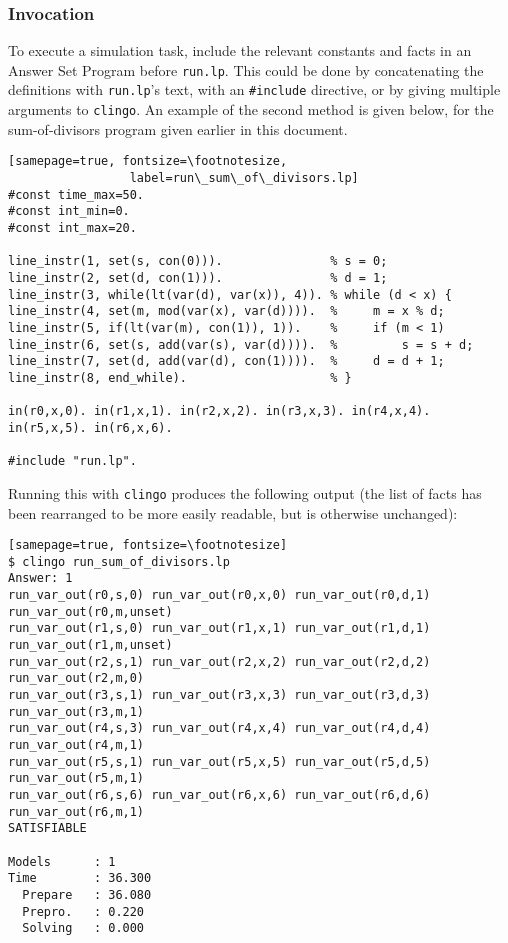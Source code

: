 \documentclass[a4paper,twoside,notitlepage,12pt]{article}
\begin{document}
\subsubsection{Invocation}

To execute a simulation task, include the relevant constants and facts in an Answer Set 
Program before \verb|run.lp|. This could be done by concatenating the definitions with 
\verb|run.lp|'s text, with an \verb|#include| directive, or by giving multiple 
arguments to \verb|clingo|. An example of the second method is given below, for the 
sum-of-divisors program given earlier in this document.

\clearpage
\begin{verbatim}[samepage=true, fontsize=\footnotesize,
                 label=run\_sum\_of\_divisors.lp]
#const time_max=50.
#const int_min=0.
#const int_max=20.

line_instr(1, set(s, con(0))).               % s = 0;
line_instr(2, set(d, con(1))).               % d = 1;
line_instr(3, while(lt(var(d), var(x)), 4)). % while (d < x) {
line_instr(4, set(m, mod(var(x), var(d)))).  %     m = x % d;
line_instr(5, if(lt(var(m), con(1)), 1)).    %     if (m < 1)
line_instr(6, set(s, add(var(s), var(d)))).  %         s = s + d;
line_instr(7, set(d, add(var(d), con(1)))).  %     d = d + 1;
line_instr(8, end_while).                    % }

in(r0,x,0). in(r1,x,1). in(r2,x,2). in(r3,x,3). in(r4,x,4). in(r5,x,5). in(r6,x,6).

#include "run.lp".
\end{verbatim}

Running this with \verb|clingo| produces the following output (the list of facts has 
been rearranged to be more easily readable, but is otherwise unchanged):

\begin{verbatim}[samepage=true, fontsize=\footnotesize]
$ clingo run_sum_of_divisors.lp
Answer: 1
run_var_out(r0,s,0) run_var_out(r0,x,0) run_var_out(r0,d,1) run_var_out(r0,m,unset)
run_var_out(r1,s,0) run_var_out(r1,x,1) run_var_out(r1,d,1) run_var_out(r1,m,unset)
run_var_out(r2,s,1) run_var_out(r2,x,2) run_var_out(r2,d,2) run_var_out(r2,m,0)
run_var_out(r3,s,1) run_var_out(r3,x,3) run_var_out(r3,d,3) run_var_out(r3,m,1)
run_var_out(r4,s,3) run_var_out(r4,x,4) run_var_out(r4,d,4) run_var_out(r4,m,1)
run_var_out(r5,s,1) run_var_out(r5,x,5) run_var_out(r5,d,5) run_var_out(r5,m,1)
run_var_out(r6,s,6) run_var_out(r6,x,6) run_var_out(r6,d,6) run_var_out(r6,m,1)
SATISFIABLE

Models      : 1     
Time        : 36.300
  Prepare   : 36.080
  Prepro.   : 0.220
  Solving   : 0.000
\end{verbatim}
\end{document}
